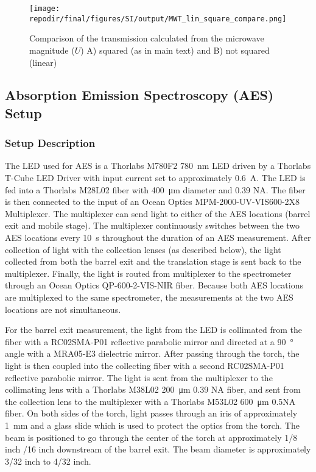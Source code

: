 \begin{figure}[H]
\centering
\texttt{[image: \\repodir/final/figures/SI/output/MWT\_lin\_square\_compare.png]}
\caption{Comparison of the transmission calculated from the microwave magnitude ($U$) A) squared (as in main text) and B) not squared (linear)}
\label{fig:SI_MWT_lin_square_compare}
\end{figure}


\clearpage
\subsection{Absorption Emission Spectroscopy (AES) Setup}

\subsubsection{Setup Description}

The LED used for AES is a Thorlabs M780F2 \SI{780}{\nano\meter} LED driven by a Thorlabs T-Cube LED Driver with input current set to approximately \SI{0.6}{\ampere}. The LED is fed into a Thorlabs M28L02 fiber with \SI{400}{\micro\meter} diameter and 0.39 NA. The fiber is then connected to the input of an Ocean Optics MPM-2000-UV-VIS600-2X8 Multiplexer. The multiplexer can send light to either of the AES locations (barrel exit and mobile stage). The multiplexer continuously switches between the two AES locations every \SI{10}{\second} throughout the duration of an AES measurement. After collection of light with the collection lenses (as described below), the light collected from both the barrel exit and the translation stage is sent back to the multiplexer. Finally, the light is routed from multiplexer to the spectrometer through an Ocean Optics QP-600-2-VIS-NIR fiber. Because both AES locations are multiplexed to the same spectrometer, the measurements at the two AES locations are not simultaneous.

For the barrel exit measurement, the light from the LED is collimated from the fiber with a RC02SMA-P01 reflective parabolic mirror and directed at a \SI{90}{\degree} angle with a MRA05-E3 dielectric mirror. After passing through the torch, the light is then coupled into the collecting fiber with a second RC02SMA-P01 reflective parabolic mirror. The light is sent from the multiplexer to the collimating lens with a Thorlabs M38L02 \SI{200}{\micro\meter} 0.39 NA fiber, and sent from the collection lens to the multiplexer with a Thorlabs M53L02 \SI{600}{\micro\meter} 0.5NA fiber. On both sides of the torch, light passes through an iris of approximately \SI{1}{\milli\meter} and a glass slide which is used to protect the optics from the torch. The beam is positioned to go through the center of the torch at approximately 1/8 inch /16 inch downstream of the barrel exit. The beam diameter is approximately 3/32 inch to 4/32 inch. 

